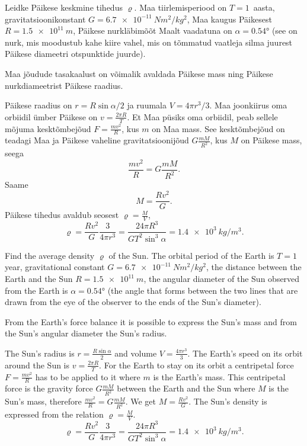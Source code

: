
Leidke Päikese keskmine tihedus $\varrho$. Maa
tiirlemisperiood on $T=1$~aasta, gravitatsioonikonstant 
$G=\SI{6.7e-11}{N m^2/kg^2}$, Maa kaugus Päikesest $R=\SI{1.5e11}{m}$, Päikese nurkläbimõõt Maalt vaadatuna on
$\alpha=\ang{0,54}$ (see on nurk, mis moodustub kahe kiire vahel, mis on tõmmatud
vaatleja silma juurest Päikese diameetri otspunktide juurde).

\hint
Maa jõudude tasakaalust on võimalik avaldada Päikese mass ning Päikese nurkdiameetrist Päikese raadius.

\solu
Päikese raadius on $r=R\sin\alpha/2$ ja ruumala $V=4\pi r^3/3$.
Maa joonkiirus oma orbiidil ümber Päikese on $v=\frac{2\pi R}{T}$. Et Maa püsiks oma orbiidil, peab sellele mõjuma kesktõmbejõud $F=\frac{mv^2}{R}$, kus $m$ on Maa mass. See kesktõmbejõud on teadagi Maa ja Päikese vaheline gravitatsioonijõud $G\frac{mM}{R^2}$, kus $M$ on Päikese mass, seega
\[
\frac{mv^2}{R}=G\frac{mM}{R^2}.
\]
Saame
\[
M=\frac{Rv^2}{G}.
\]
Päikese tihedus avaldub seosest $\varrho=\frac{M}{V}$, $$\varrho=\frac{Rv^2}{G} \frac{3}{4\pi r^3}=\frac{24 \pi R^3}{G T^2 \sin^3 \alpha}=\SI{1,4e3}{kg/m^3}.$$

Find the average density $\varrho$ of the Sun. The orbital period of the Earth is $T=1$ year, gravitational constant $G=\SI{6.7e-11}{N m^2/kg^2}$, the distance between the Earth and the Sun $R=\SI{1.5e11}{m}$, the angular diameter of the Sun observed from the Earth is $\alpha=\ang{0,54}$ (the angle that forms between the two lines that are drawn from the eye of the observer to the ends of the Sun’s diameter).

\hinteng
From the Earth’s force balance it is possible to express the Sun’s mass and from the Sun’s angular diameter the Sun’s radius.

\solueng
The Sun’s radius is $r=\frac{R\sin\alpha}{2}$ and volume $V=\frac{4\pi r^3}{3}$. The Earth’s speed on its orbit around the Sun is $v=\frac{2\pi R}{T}$. For the Earth to stay on its orbit a centripetal force $F=\frac{mv^2}{R}$ has to be applied to it where $m$ is the Earth’s mass. This centripetal force is the gravity force $G\frac{mM}{R^2}$ between the Earth and the Sun where $M$ is the Sun’s mass, therefore $\frac{mv^2}{R}=G\frac{mM}{R^2}$. We get $M=\frac{Rv^2}{G}$. The Sun’s density is expressed from the relation $\varrho=\frac{M}{V}$. 
$$\varrho=\frac{Rv^2}{G} \frac{3}{4\pi r^3}=\frac{24 \pi R^3}{G T^2 \sin^3 \alpha}=\SI{1,4e3}{kg/m^3}.$$
\probend